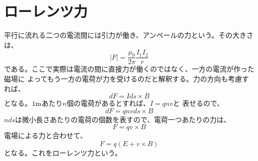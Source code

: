 \documentclass{jsarticle}
\begin{document}
    \section{ローレンツ力}
        平行に流れる二つの電流間には引力が働き、アンペールの力という。その大きさは、
            \[|F| = \frac{\mu_0}{2\pi}\frac{I_1 I_2}{r}\]
        である。ここで実際は電流の間に直接力が働くのではなく、一方の電流が作った磁場に
        よってもう一方の電荷が力を受けるのだと解釈する。力の方向も考慮すれば、
            \[dF = Ids\times B\]
        となる。$1\rm{m}$あたり$n$個の電荷があるとすれば、$I=qnv$と
        表せるので、
            \[dF = qnvds\times B\]
        $nds$は微小長さあたりの電荷の個数を表すので、電荷一つあたりの力は、
            \[F = qv\times B\]
        電場による力と合わせて、
            \[F = q(E+v\times B)\]
        となる。これをローレンツ力という。
\end{document}

